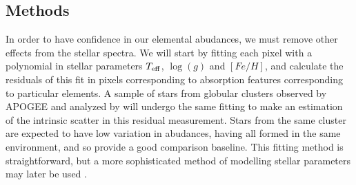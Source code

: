 \documentclass[manuscript]{aastex}
\begin{document}
\subsection{Methods}
\label{sec:methods}

In order to have confidence in our elemental abudances, we must remove other effects from the stellar spectra. We will start by fitting each pixel with a polynomial in stellar parameters $T_{\rm eff}$, $\log(g)$ and $[Fe/H]$, and calculate the residuals of this fit in pixels corresponding to absorption features corresponding to particular elements. A sample of stars from globular clusters observed by APOGEE and analyzed by \citet{meszaros2015} will undergo the same fitting to make an estimation of the intrinsic scatter in this residual measurement. Stars from the same cluster are expected to have low variation in abudances, having all formed in the same environment, and so provide a good comparison baseline. This fitting method is straightforward, but a more sophisticated method of modelling stellar parameters may later be used \citep{ness2015}.


\end{document}

